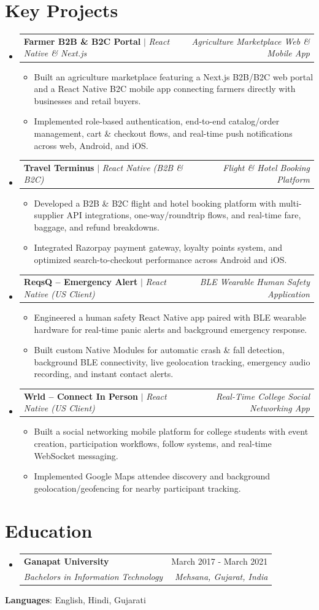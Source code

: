 \documentclass[letterpaper,10.5pt]{article}
\makeatletter
\newcommand{\resumeItem}[1]{
  \item\small{
    {#1 \vspace{-2pt}}
  }
}
\newcommand{\resumeSubheading}[4]{
  \vspace{-1pt}\item
    \begin{tabular*}{0.99\textwidth}[t]{l@{\extracolsep{\fill}}r}
      \textbf{#1} & \small #2 \\
      \textit{\small#3} & \textit{\small #4} \\
    \end{tabular*}\vspace{-6pt}
}
\newcommand{\resumeProjectHeading}[2]{
  \item
    \begin{tabular*}{0.99\textwidth}{l@{\extracolsep{\fill}}r}
      \small#1 & \textit{\small #2} \\
    \end{tabular*}\vspace{-6pt}
}
\newcommand{\resumeSubHeadingListStart}{\begin{itemize}[leftmargin=0.0in, label={}]}
\newcommand{\resumeSubHeadingListEnd}{\end{itemize}}
\newcommand{\resumeItemListStart}{\begin{itemize}[leftmargin=0.16in]}
\newcommand{\resumeItemListEnd}{\end{itemize}\vspace{-4pt}}
\makeatother
\begin{document}
\section{Key Projects}
\resumeSubHeadingListStart
\resumeProjectHeading
  {\textbf{Farmer B2B \& B2C Portal} $|$ \emph{React Native \& Next.js}}{Agriculture Marketplace Web \& Mobile App}
  \resumeItemListStart
    \resumeItem{Built an agriculture marketplace featuring a Next.js B2B/B2C web portal and a React Native B2C mobile app connecting farmers directly with businesses and retail buyers.}
    \resumeItem{Implemented role-based authentication, end-to-end catalog/order management, cart \& checkout flows, and real-time push notifications across web, Android, and iOS.}
  \resumeItemListEnd

\resumeProjectHeading
  {\textbf{Travel Terminus} $|$ \emph{React Native (B2B \& B2C)}}{Flight \& Hotel Booking Platform}
  \resumeItemListStart
    \resumeItem{Developed a B2B \& B2C flight and hotel booking platform with multi-supplier API integrations, one-way/roundtrip flows, and real-time fare, baggage, and refund breakdowns.}
    \resumeItem{Integrated Razorpay payment gateway, loyalty points system, and optimized search-to-checkout performance across Android and iOS.}
  \resumeItemListEnd

\resumeProjectHeading
  {\textbf{ReqsQ -- Emergency Alert} $|$ \emph{React Native (US Client)}}{BLE Wearable Human Safety Application}
  \resumeItemListStart
    \resumeItem{Engineered a human safety React Native app paired with BLE wearable hardware for real-time panic alerts and background emergency response.}
    \resumeItem{Built custom Native Modules for automatic crash \& fall detection, background BLE connectivity, live geolocation tracking, emergency audio recording, and instant contact alerts.}
  \resumeItemListEnd

\resumeProjectHeading
  {\textbf{Wrld -- Connect In Person} $|$ \emph{React Native (US Client)}}{Real-Time College Social Networking App}
  \resumeItemListStart
    \resumeItem{Built a social networking mobile platform for college students with event creation, participation workflows, follow systems, and real-time WebSocket messaging.}
    \resumeItem{Implemented Google Maps attendee discovery and background geolocation/geofencing for nearby participant tracking.}
  \resumeItemListEnd
\resumeSubHeadingListEnd
\vspace{-6pt}

\section{Education}
\resumeSubHeadingListStart
\resumeSubheading
  {Ganapat University}{March 2017 - March 2021}
  {Bachelors in Information Technology}{Mehsana, Gujarat, India}
\resumeSubHeadingListEnd
\vspace{-6pt}
\small{\noindent\textbf{Languages}: English, Hindi, Gujarati}
\end{document}

